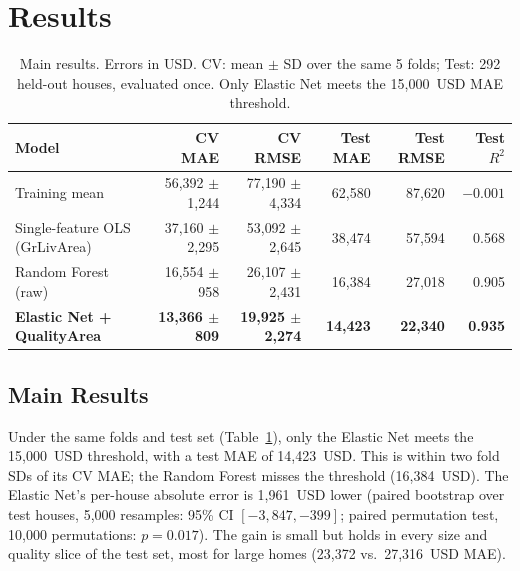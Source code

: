 \section{Results}
\label{sec:results}

\begin{table}[t]
\centering
\footnotesize
\begin{tabular}{@{}l r r r r r@{}}
\toprule
\textbf{Model} & \textbf{CV MAE} & \textbf{CV RMSE} & \textbf{Test MAE} & \textbf{Test RMSE} & \textbf{Test $R^2$} \\
\midrule
Training mean              & 56{,}392 $\pm$ 1{,}244 & 77{,}190 $\pm$ 4{,}334 & 62{,}580 & 87{,}620 & $-0.001$ \\
Single-feature OLS (GrLivArea) & 37{,}160 $\pm$ 2{,}295 & 53{,}092 $\pm$ 2{,}645 & 38{,}474 & 57{,}594 & 0.568 \\
Random Forest (raw)        & 16{,}554 $\pm$ 958     & 26{,}107 $\pm$ 2{,}431 & 16{,}384 & 27{,}018 & 0.905 \\
\textbf{Elastic Net + QualityArea} & \textbf{13{,}366 $\pm$ 809} & \textbf{19{,}925 $\pm$ 2{,}274} & \textbf{14{,}423} & \textbf{22{,}340} & \textbf{0.935} \\
\bottomrule
\end{tabular}
\caption{Main results. Errors in USD. CV: mean $\pm$ SD over the same 5 folds; Test: 292 held-out houses, evaluated once. Only Elastic Net meets the 15{,}000~USD MAE threshold.}
\label{tab:main}
\end{table}

\subsection{Main Results}
Under the same folds and test set (Table~\ref{tab:main}), only the Elastic Net meets the 15{,}000~USD threshold, with a test MAE of 14{,}423~USD.
This is within two fold SDs of its CV MAE; the Random Forest misses the threshold (16{,}384~USD).
The Elastic Net's per-house absolute error is 1{,}961~USD lower (paired bootstrap over test houses, 5{,}000 resamples: 95\% CI $[-3{,}847, -399]$; paired permutation test, 10{,}000 permutations: $p = 0.017$).
The gain is small but holds in every size and quality slice of the test set, most for large homes (23{,}372 vs.\ 27{,}316~USD MAE).

